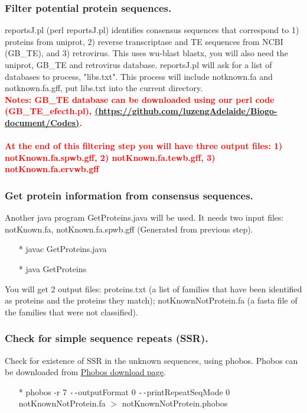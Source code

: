 \documentclass[12pt]{report}
\begin{document}
\subsubsection*{Filter potential protein sequences.}
reportsJ.pl (perl reportsJ.pl) identifies consensus sequences that correspond to 1) proteins from uniprot, 2) reverse transcriptase and TE sequences from NCBI (GB\_TE), and 3) retrovirus. This uses wu-blast blastx, you will also need the uniprot, GB\_TE and retrovirus database. reportsJ.pl will ask for a list of databases to process, "libs.txt". This process will include notknown.fa and notknown.fa.gff, put libs.txt into the current directory. \\

\noindent\textbf{\textcolor{red}{Notes: GB\_TE database can be downloaded using our perl code (GB\_TE\_efecth.pl), \href{<url>}(\url{https://github.com/luzengAdelaide/Biogo-document/Codes)}. \\
		\\
At the end of this filtering step you will have three output files: 1) notKnown.fa.spwb.gff, 2) notKnown.fa.tewb.gff, 3) notKnown.fa.ervwb.gff}} 

\subsubsection*{Get protein information from consensus sequences.}
Another java program GetProteins.java will be used. It needs two input files: notKnown.fa, notKnown.fa.spwb.gff (Generated from previous step).
\begin{enumerate}
	\item[*] javac GetProteins.java
	\item[*] java GetProteins
\end{enumerate}
You will get 2 output files: proteins.txt (a list of families that have been identified as proteins and the proteins they match);
notKnownNotProtein.fa (a fasta file of the families that were not classified).

\subsubsection*{Check for simple sequence repeats (SSR).}
Check for existence of SSR in the unknown sequences, using phobos. Phobos can be downloaded from \href{http://www.ruhr-uni-bochum.de/ecoevo/cm/cm_phobos.htm} {\color{blue} Phobos download page}.
\begin{enumerate}
	\item[*] phobos -r 7 \texttt{-{}-}outputFormat 0 \texttt{-{}-}printRepeatSeqMode 0 notKnownNotProtein.fa $>$ notKnownNotProtein.phobos
\end{enumerate}
\end{document}
